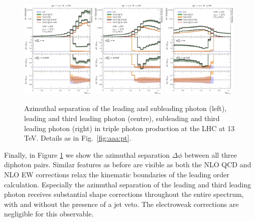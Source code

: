 \begin{figure}[t!]
  \centering
  \includegraphics[width=0.32\textwidth]{figs_aaa/dphi_y1y2}
  \includegraphics[width=0.32\textwidth]{figs_aaa/dphi_y1y3}
  \includegraphics[width=0.32\textwidth]{figs_aaa/dphi_y2y3}
  \caption{
    Azimuthal separation of the leading and subleading photon (left),
    leading and third leading photon (centre), subleading and third leading 
    photon (right) 
    in triple photon production at the LHC at 13\,TeV. 
    Details as in Fig.\ \ref{fig:aaa:pt}.
    \label{fig:aaa:dphi}
  }
\end{figure}

Finally, in Figure \ref{fig:aaa:dphi} we show the azimuthal 
separation $\Delta\phi$ between all three diphoton pairs. 
Similar features as before are visible as both the NLO QCD 
and NLO EW corrections relax the kinematic boundaries of 
the leading order calculation. 
Especially the azimuthal separation of the leading and 
third leading photon receives substantial shape corrections 
throughout the entire spectrum, with and without the 
presence of a jet veto. 
The electroweak corrections are negligible for this 
observable.


